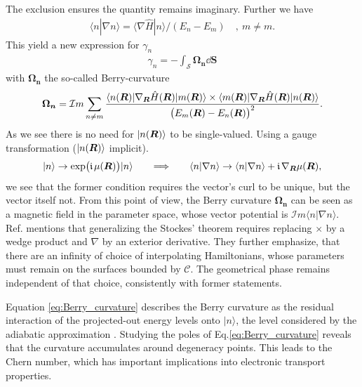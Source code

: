 \documentclass[../main]{subfiles}
\begin{document}
    The exclusion ensures the quantity remains imaginary. Further we have 
    \begin{align*}
        \langle n|\nabla n \rangle = \langle \nabla \hat{H} | n\rangle / (E_n - E_m) \quad,~ m\neq m.
    \end{align*}  
    This yield a new expression for $\gamma_n$ 
    \begin{align*}
        \gamma_n = -\int_{\mathcal{S}} \bm{\Omega_n} \dd\bm{S}
    \end{align*}
    with  $\bm{\Omega_n}$ the so-called Berry-curvature 
    \begin{align}\label{eq:Berry_curvature}
         \bm{\Omega_n} = \mathcal{I}m \sum_{n\neq m} \frac{\langle n(\bm{R})| \nabla_{\bm{R}}\hat{H}(\bm{R}) |m(\bm{R})\rangle \times \langle m (\bm{R}) | \nabla_{\bm{R}}\hat{H}(\bm{R}) |n(\bm{R})\rangle}{\bigl(E_m(\bm{R}) -E_n(\bm{R})\bigr)^2}.
    \end{align}
    As we see there is no need for $|n(\bm{R})\rangle$ to be single-valued. Using a gauge transformation ($|n(\bm{R})\rangle$ implicit).
    \begin{align*}
        |n\rangle \rightarrow \exp\bigl(\large\mathfrak{i}\hspace*{1.3pt}\normalsize \mu(\bm{R})\bigr)|n\rangle \hspace*{18pt}\Longrightarrow\hspace*{18pt} \langle n|\nabla n\rangle \rightarrow \langle n|\nabla n\rangle + \large\mathfrak{i}\hspace*{1.3pt}\normalsize \nabla_{\bm{R}}\mu(\bm{R}),
    \end{align*}
    we see that the former condition requires the vector's curl to be unique, but the vector itself not. From this point of view, the Berry curvature $\bm{\Omega_n}$ can be seen as a magnetic field in the parameter space, whose vector potential
    is $\mathcal{I}m\langle n|\nabla n\rangle$. Ref. \cite{Berry1984-gt} mentions that generalizing the Stockes' theorem requires replacing $\times$ by a wedge product and $\nabla$ by an exterior derivative. They
    further emphasize, that there are an infinity of choice of interpolating Hamiltonians, whose parameters must remain on the surfaces  bounded by $\mathcal{C}$. The geometrical phase remains independent of that choice, consistently with former statements.\newline

    Equation \ref{eq:Berry_curvature} describes the Berry curvature as the residual interaction of the projected-out energy levels onto $|n\rangle$, the level considered by the adiabatic approximation \cite{Xiao2010-lt}.
    Studying the poles of Eq.\ref{eq:Berry_curvature} reveals that the curvature accumulates around degeneracy points. This leads to the Chern number, which has important implications into electronic transport properties.
\end{document}
